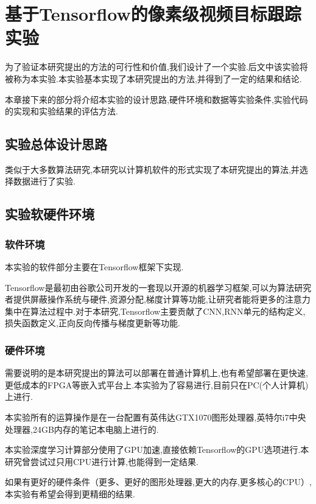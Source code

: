
\chapter{基于Tensorflow的像素级视频目标跟踪实验} \label{section:experiment}
为了验证本研究提出的方法的可行性和价值,我们设计了一个实验.后文中该实验将被称为本实验.本实验基本实现了本研究提出的方法,并得到了一定的结果和结论.
\par
本章接下来的部分将介绍本实验的设计思路,硬件环境和数据等实验条件,实验代码的实现和实验结果的评估方法.

\section{实验总体设计思路}
类似于大多数算法研究,本研究以计算机软件的形式实现了本研究提出的算法,并选择数据进行了实验.

\section{实验软硬件环境}
\subsection{软件环境}
本实验的软件部分主要在Tensorflow\supercite{abadi2016tensorflow}框架下实现.
\par
Tensorflow是最初由谷歌公司开发的一套现以开源的机器学习框架,可以为算法研究者提供屏蔽操作系统与硬件,资源分配,梯度计算等功能,让研究者能将更多的注意力集中在算法过程中.对于本研究,Tensorflow主要贡献了CNN,RNN单元的结构定义,损失函数定义,正向反向传播与梯度更新等功能.

\subsection{硬件环境}
\par
需要说明的是本研究提出的算法可以部署在普通计算机上,也有希望部署在更快速,更低成本的FPGA等嵌入式平台上.本实验为了容易进行,目前只在PC(个人计算机)上进行.
\par
本实验所有的运算操作是在一台配置有英伟达GTX1070图形处理器,英特尔i7中央处理器,24GB内存的笔记本电脑上进行的.
\par
本实验深度学习计算部分使用了GPU加速,直接依赖Tensorflow的GPU选项进行.本研究曾尝试过只用CPU进行计算,也能得到一定结果.
\par
如果有更好的硬件条件（更多、更好的图形处理器,更大的内存,更多核心的CPU）,本实验有希望会得到更精细的结果.

